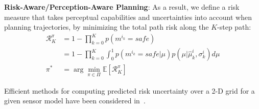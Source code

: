 \documentclass[letterpaper, 10pt, conference]{ieeeconf}      %
\newcommand{\ph}[1]{{\textbf{#1}:}} %
\newcommand{\rev}[1]{{\color{blue} #1 }} %
\begin{document}
\rev{\ph{Risk-Aware/Perception-Aware Planning}}
As a result, we define a risk measure that takes perceptual capabilities and uncertainties into account when planning trajectories, by minimizing the total path risk along the $K$-step path:
\rev{
\begin{align}
 \mathcal{R}_K^{\pi} &= 1 - \prod_{k=0}^K p(m^{i_k}=safe) \\
 &= 1 - \prod_{k=0}^K\int_0^1 p(m^{i_k} = safe|\mu)p(\mu|\hat{\mu}_k^{i},\sigma_k^{i}) d\mu\\
 \pi^* &= \arg\min_{\pi\in\Pi}\mathbb{E}[\mathcal{R}_K^{\pi}]
 \label{eq:risk}
\end{align}}

Efficient methods for computing predicted risk uncertainty over a 2-D grid for a given sensor model have been considered in~\cite{CRM}.
\end{document}
